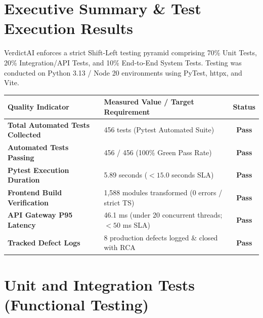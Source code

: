 \documentclass[11pt,a4paper]{article}
\begin{document}
\section{Executive Summary \& Test Execution Results}

VerdictAI enforces a strict Shift-Left testing pyramid comprising 70\% Unit Tests, 20\% Integration/API Tests, and 10\% End-to-End System Tests. Testing was conducted on Python 3.13 / Node 20 environments using PyTest, httpx, and Vite.

\begin{table}[H]
\centering
\renewcommand{\arraystretch}{1.3}
\begin{tabular}{>{\bfseries}p{} p{} c}
\toprule
\textbf{Quality Indicator} & \textbf{Measured Value / Target Requirement} & \textbf{Status} \\
\midrule
Total Automated Tests Collected & 456 tests (Pytest Automated Suite) & \textbf{Pass} \\
Automated Tests Passing & 456 / 456 (100\% Green Pass Rate) & \textbf{Pass} \\
Pytest Execution Duration & 5.89 seconds ($< 15.0$ seconds SLA) & \textbf{Pass} \\
Frontend Build Verification & 1,588 modules transformed (0 errors / strict TS) & \textbf{Pass} \\
API Gateway P95 Latency & 46.1 ms (under 20 concurrent threads; $< 50$ ms SLA) & \textbf{Pass} \\
Tracked Defect Logs & 8 production defects logged \& closed with RCA & \textbf{Pass} \\
\bottomrule
\end{tabular}
\end{table}

\newpage

\section{Unit and Integration Tests (Functional Testing)}
\end{document}
